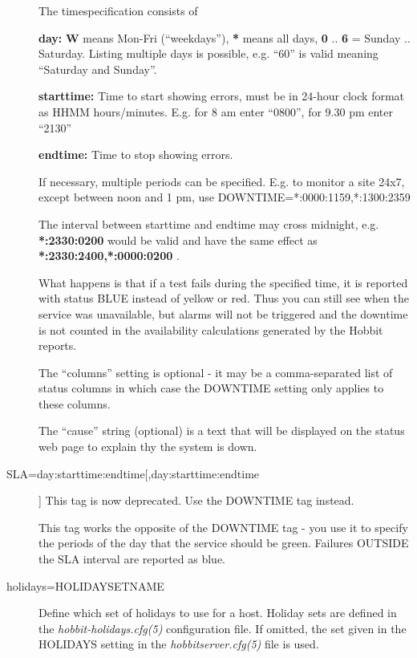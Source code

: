 \begin{description}
  The timespecification consists of 


 \textbf{day:}
 \textbf{W}
 means Mon-Fri (``weekdays''), \textbf{*}
 means all days, \textbf{0}
 .. \textbf{6}
 = Sunday .. Saturday. Listing multiple days is possible, e.g. ``60'' is valid meaning ``Saturday and Sunday''. 


 \textbf{starttime:}
 Time to start showing errors, must be in 24-hour clock format as HHMM
 hours/minutes. E.g. for 8 am enter ``0800'', for 9.30 pm enter
 ``2130'' 



 \textbf{endtime:}
 Time to stop showing errors. 


  If necessary, multiple periods can be specified. E.g. to monitor a site 24x7, except between noon and 1 pm, use DOWNTIME=*:0000:1159,*:1300:2359 


  The interval between starttime and endtime may cross midnight, e.g. \textbf{*:2330:0200}
 would be valid and have the same effect as \textbf{*:2330:2400,*:0000:0200}
. 


  What happens is that if a test fails during the specified time, it
  is reported with status BLUE instead of yellow or red. Thus you can
  still see when the service was unavailable, but alarms will not be
  triggered and the downtime is not counted in the availability
  calculations generated by the Hobbit reports. 



  The ``columns'' setting is optional - it may be a comma-separated list of status columns in which case the DOWNTIME setting only applies to these columns. 


  The ``cause'' string (optional) is a text that will be displayed on the status web page to explain thy the system is down. 


 

\item[SLA=day:starttime:endtime[,day:starttime:endtime]] This tag is now deprecated. Use the DOWNTIME tag instead. 

  This tag works the opposite of the DOWNTIME tag - you use it to
  specify the periods of the day that the service should be
  green. Failures OUTSIDE the SLA interval are reported as blue. 



 

\item[holidays=HOLIDAYSETNAME] Define which set of holidays to use for
  a host. Holiday sets are defined in the
  \emph{hobbit-holidays.cfg(5)} configuration file. If omitted, the
  set given in the HOLIDAYS setting in the \emph{hobbitserver.cfg(5)}
  file is used. 



\end{description}


